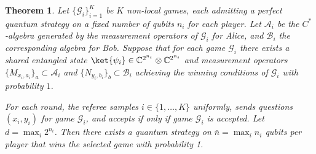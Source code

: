 \documentclass{article}
\newtheorem{theorem}{Theorem}
\begin{document}
    \begin{theorem}
        Let $\{\mathcal{G}_i\}_{i=1}^K$ be $K$ non-local games, each admitting a perfect quantum strategy on a fixed number of qubits $n_i$ for each player. 
        Let $\mathcal{A}_i$ be the $C^*$-algebra generated by the measurement operators of $\mathcal{G}_i$ for Alice, and $\mathcal{B}_i$ the corresponding algebra for Bob. 
        Suppose that for each game $\mathcal{G}_i$ there exists a shared entangled state $\ket{\psi_i} \in \mathbb{C}^{2^{n_i}} \otimes \mathbb{C}^{2^{n_i}}$
        and measurement operators $\{M_{x_i,a_i}\}_a \subset \mathcal{A}_i$ and $\{N_{y_i,b_i}\}_b \subset \mathcal{B}_i$ 
        achieving the winning conditions of $\mathcal{G}_i$ with probability $1$.  
        
        For each round, the referee samples $i\in\{1, \dots, K\}$ uniformly, sends questions $(x_i,y_i)$ for game $\mathcal{G}_i$, and accepts if only if game $\mathcal{G}_i$ is accepted. Let $d=\max_i 2^{n_i}$. Then there exists a quantum strategy on $\bar{n}=\max_i n_i$ qubits per player that wins the selected game with probability 1. 
    \end{theorem}
\end{document}
